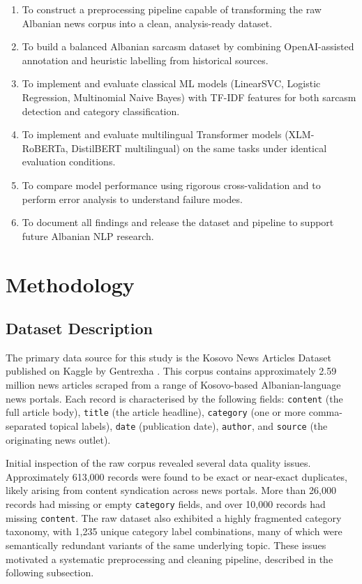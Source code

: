 \documentclass[12pt,a4paper]{article}
\begin{document}
\begin{enumerate}[leftmargin=1.5em, itemsep=0.2em]
    \item To construct a preprocessing pipeline capable of transforming the raw Albanian news corpus into a clean, analysis-ready dataset.
    \item To build a balanced Albanian sarcasm dataset by combining OpenAI-assisted annotation and heuristic labelling from historical sources.
    \item To implement and evaluate classical ML models (LinearSVC, Logistic Regression, Multinomial Naive Bayes) with TF-IDF features for both sarcasm detection and category classification.
    \item To implement and evaluate multilingual Transformer models (XLM-RoBERTa, DistilBERT multilingual) on the same tasks under identical evaluation conditions.
    \item To compare model performance using rigorous cross-validation and to perform error analysis to understand failure modes.
    \item To document all findings and release the dataset and pipeline to support future Albanian NLP research.
\end{enumerate}

\newpage
\section{Methodology}
\label{sec:methodology}

\subsection{Dataset Description}
\label{subsec:dataset_desc}

The primary data source for this study is the Kosovo News Articles Dataset published on Kaggle by Gentrexha \citep{gentrexha2023kosovo}. This corpus contains approximately 2.59 million news articles scraped from a range of Kosovo-based Albanian-language news portals. Each record is characterised by the following fields: \texttt{content} (the full article body), \texttt{title} (the article headline), \texttt{category} (one or more comma-separated topical labels), \texttt{date} (publication date), \texttt{author}, and \texttt{source} (the originating news outlet).

Initial inspection of the raw corpus revealed several data quality issues. Approximately 613,000 records were found to be exact or near-exact duplicates, likely arising from content syndication across news portals. More than 26,000 records had missing or empty \texttt{category} fields, and over 10,000 records had missing \texttt{content}. The raw dataset also exhibited a highly fragmented category taxonomy, with 1,235 unique category label combinations, many of which were semantically redundant variants of the same underlying topic. These issues motivated a systematic preprocessing and cleaning pipeline, described in the following subsection.
\end{document}
